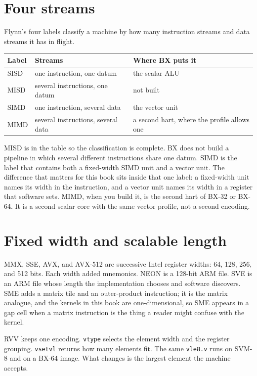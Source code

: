 \section{Four streams}

Flynn's four labels classify a machine by how many instruction streams and data streams it has in flight.

\begin{center}
\begin{tabular}{@{}llp{6.4cm}@{}}
\toprule
Label & Streams & Where BX puts it \\
\midrule
SISD & one instruction, one datum & the scalar ALU \\
MISD & several instructions, one datum & not built \\
SIMD & one instruction, several data & the vector unit \\
MIMD & several instructions, several data & a second hart, where the profile allows one \\
\bottomrule
\end{tabular}
\end{center}

MISD is in the table so the classification is complete. BX does not build a pipeline in which several different instructions share one datum. SIMD is the label that contains both a fixed-width SIMD unit and a vector unit. The difference that matters for this book sits inside that one label: a fixed-width unit names its width in the instruction, and a vector unit names its width in a register that software sets. MIMD, when you build it, is the second hart of BX-32 or BX-64. It is a second scalar core with the same vector profile, not a second encoding.

\section{Fixed width and scalable length}

MMX, SSE, AVX, and AVX-512 are successive Intel register widths: 64, 128, 256, and 512 bits. Each width added mnemonics. NEON is a 128-bit ARM file. SVE is an ARM file whose length the implementation chooses and software discovers. SME adds a matrix tile and an outer-product instruction; it is the matrix analogue, and the kernels in this book are one-dimensional, so SME appears in a gap cell when a matrix instruction is the thing a reader might confuse with the kernel.

RVV keeps one encoding. \texttt{vtype} selects the element width and the register grouping. \texttt{vsetvl} returns how many elements fit. The same \texttt{vle8.v} runs on SVM-8 and on a BX-64 image. What changes is the largest element the machine accepts.

